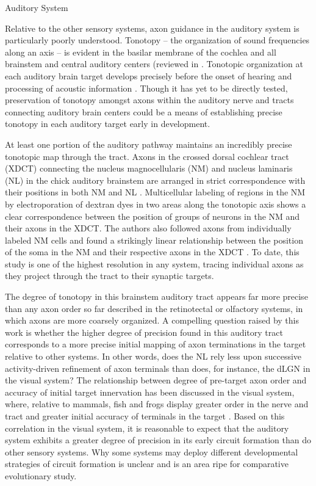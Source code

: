 Auditory System

Relative to the other sensory systems, axon guidance in the auditory system is particularly poorly understood. 
Tonotopy – the organization of sound frequencies along an axis – is evident in the basilar membrane of the cochlea and all brainstem and central auditory centers (reviewed in \cite{appler2011connecting}. 
Tonotopic organization at each auditory brain target develops precisely before the onset of hearing and processing of acoustic information \cite{appler2011connecting,rubel2002auditory}. 
Though it has yet to be directly tested, preservation of tonotopy amongst axons within the auditory nerve and tracts connecting auditory brain centers could be a means of establishing precise tonotopy in each auditory target early in development. 

At least one portion of the auditory pathway maintains an incredibly precise tonotopic map through the tract. 
Axons in the crossed dorsal cochlear tract (XDCT) connecting the nucleus magnocellularis (NM) and nucleus laminaris (NL) in the chick auditory brainstem are arranged in strict correspondence with their positions in both NM and NL \cite{kashima2013pre}. 
Multicellular labeling of regions in the NM by electroporation of dextran dyes in two areas along the tonotopic axis shows a clear correspondence between the position of groups of neurons in the NM and their axons in the XDCT. 
The authors also followed axons from individually labeled NM cells and found a strikingly linear relationship between the position of the soma in the NM and their respective axons in the XDCT \cite{kashima2013pre}. 
To date, this study is one of the highest resolution in any system, tracing individual axons as they project through the tract to their synaptic targets. 

The degree of tonotopy in this brainstem auditory tract appears far more precise than any axon order so far described in the retinotectal or olfactory systems, in which axons are more coarsely organized. 
A compelling question raised by this work is whether the higher degree of precision found in this auditory tract corresponds to a more precise initial mapping of axon terminations in the target relative to other systems. 
In other words, does the NL rely less upon successive activity-driven refinement of axon terminals than does, for instance, the dLGN in the visual system? 
The relationship between degree of pre-target axon order and accuracy of initial target innervation has been discussed in the visual system, where, relative to mammals, fish and frogs display greater order in the nerve and tract and greater initial accuracy of terminals in the target \cite{simon1991relationship}. 
Based on this correlation in the visual system, it is reasonable to expect that the auditory system exhibits a greater degree of precision in its early circuit formation than do other sensory systems. 
Why some systems may deploy different developmental strategies of circuit formation is unclear and is an area ripe for comparative evolutionary study. 